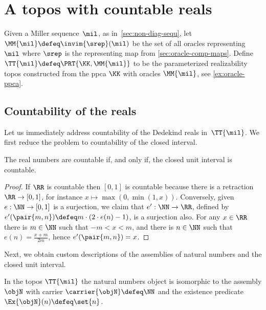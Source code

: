 \section{A topos with countable reals}
\label{sec:topos-with-countable}

Given a Miller sequence~$\mil$, as in~\cref{sec:non-diag-sequ}, let~$\MM{\mil} \defeq \invim{\srep}(\mil)$ be the set of all oracles representing~$\mil$ where $\srep$ is the representing map from \cref{sec:oracle-comp-maps}. Define $\TT{\mil} \defeq \PRT{\KK,\MM{\mil}}$ to be the parameterized realizability topos constructed from the ppca $\KK$ with oracles $\MM{\mil}$, see \cref{ex:oracle-ppca}.

\subsection{Countability of the reals}
\label{sec:countability-reals}
%
Let us immediately address countability of the Dedekind reals in~$\TT{\mil}$. 
We first reduce the problem to countability of the closed interval.

\begin{lemmaC}
  \label{lem:R-contable-iff-I-countable}%
  The real numbers are countable if, and only if, the closed unit interval is countable.
\end{lemmaC}

\begin{proof}
  If $\RR$ is countable then $[0,1]$ is countable because there is a retraction $\RR \to [0,1]$, for instance
  $x \mapsto \max(0, \min(1, x))$.
  Conversely, given $e : \NN \to [0,1]$ is a surjection, we claim that $e' : \NN \to \RR$, defined by
  $e'(\pair{m, n}) \defeq m \cdot (2 \cdot e(n) - 1)$, is a surjection also. For any $x \in \RR$ there is $m \in \NN$ such that
  $-m < x < m$, and there is $n \in \NN$ such that $e(n) = \frac{x + m}{2 m}$, hence $e'(\pair{m, n}) = x$.
\end{proof}

Next, we obtain custom descriptions of the assemblies of natural numbers and the closed unit interval.

\begin{lemma}
  \label{lem:nno-assembly}%
  In the topos $\TT{\mil}$ the natural numbers object is isomorphic to the assembly $\objN$ with carrier
  $\carrier{\objN} \defeq \NN$ and the existence predicate
  $\Ex{\objN}(n) \defeq \set{n}$.
\end{lemma}

